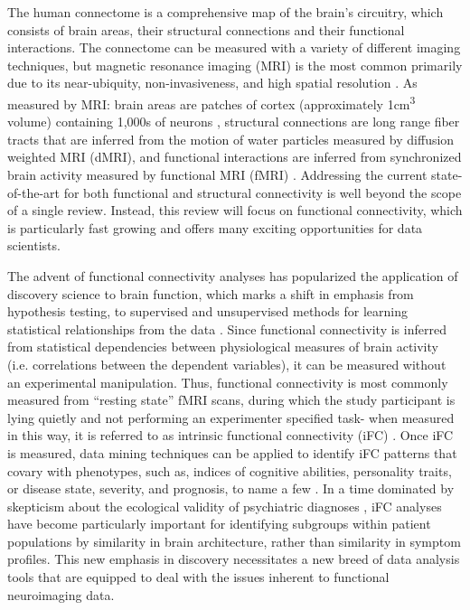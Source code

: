 \documentclass{bmcart}
\begin{document}
The human connectome is a comprehensive map of the brain's circuitry, which consists of brain areas, their structural connections and their functional interactions. The connectome can be measured with a variety of different imaging techniques, but magnetic resonance imaging (MRI) is the most common primarily due to its near-ubiquity, non-invasiveness, and high spatial resolution \cite{Craddock2013}. As measured by MRI: brain areas are patches of cortex (approximately 1\si{\centi\meter\cubed} volume) containing 1,000s of neurons \cite{Varela2001}, structural connections are long range fiber tracts that are inferred from the motion of water particles measured by diffusion weighted MRI (dMRI), and functional interactions are inferred from synchronized brain activity measured by functional MRI (fMRI) \cite{Behrens2012}. Addressing the current state-of-the-art for both functional and structural connectivity is well beyond the scope of a single review. Instead, this review will focus on functional connectivity, which is particularly fast growing and offers many exciting opportunities for data scientists.

The advent of functional connectivity analyses has popularized the application of discovery science to brain function, which marks a shift in emphasis from hypothesis testing, to supervised and unsupervised methods for learning statistical relationships from the data \cite{Biswal2010}. Since functional connectivity is inferred from statistical dependencies between physiological measures of brain activity (i.e. correlations between the dependent variables), it can be measured without an experimental manipulation. Thus, functional connectivity is most commonly measured from ``resting state'' fMRI scans, during which the study participant is lying quietly and not performing an experimenter specified task- when measured in this way, it is referred to as intrinsic functional connectivity (iFC) \cite{Biswal1995}. Once iFC is measured, data mining techniques can be applied to identify iFC patterns that covary with phenotypes, such as, indices of cognitive abilities, personality traits, or disease state, severity, and prognosis, to name a few \cite{Varoquaux2013}. In a time dominated by skepticism about the ecological validity of psychiatric diagnoses \cite{Kapur2012}, iFC analyses have become particularly important for identifying subgroups within patient populations by similarity in brain architecture, rather than similarity in symptom profiles. This new emphasis in discovery necessitates a new breed of data analysis tools that are equipped to deal with the issues inherent to functional neuroimaging data.
\end{document}
